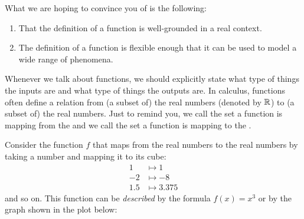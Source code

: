 \documentclass{ximera}
\begin{document}
What we are hoping to convince you of is the following:
\begin{enumerate}
\item That the definition of a function is well-grounded in a real context.
\item The definition of a function is flexible enough that it can be
  used to model a wide range of phenomena.
\end{enumerate}






Whenever we talk about functions, we should explicitly state
what type of things the inputs are and what type of things the outputs
are.  In calculus, functions often define a relation from (a subset
of) the real numbers (denoted by $\mathbb R$) to (a subset of) the real
numbers.  Just to remind you, we call the set a function is mapping
from the  and we call the set a function is
mapping to the .


\begin{example}
Consider the function $f$ that maps from the real numbers to the real
numbers by taking a number and mapping it to its cube:
\begin{align*}
1 &\mapsto 1\\
-2 &\mapsto -8\\
1.5 &\mapsto 3.375
\end{align*}
and so on. This function can be \textit{described} by the formula
$f(x)=x^3$ or by the graph shown in the plot below:

\begin{image}
\end{image}
\end{example}
\end{document}
